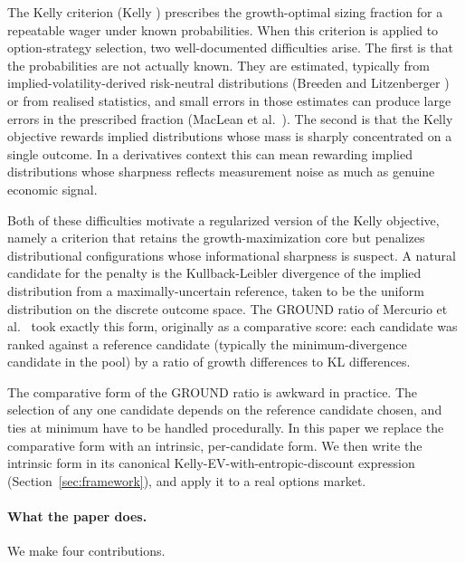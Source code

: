 \documentclass[11pt]{article}
\theoremstyle{definition}
\theoremstyle{remark}
\begin{document}
The Kelly criterion (Kelly \cite{kelly1956}) prescribes the
growth-optimal sizing fraction for a repeatable wager under known
probabilities. When this criterion is applied to option-strategy
selection, two well-documented difficulties arise. The first is that
the probabilities are not actually known. They are estimated,
typically from implied-volatility-derived risk-neutral distributions
(Breeden and Litzenberger \cite{breeden1978}) or from realised
statistics, and small errors in those estimates can produce large
errors in the prescribed fraction (MacLean et al.\ \cite{maclean2011}). The second is that the Kelly objective rewards
implied distributions whose mass is sharply concentrated on a single
outcome. In a derivatives context this can mean rewarding implied
distributions whose sharpness reflects measurement noise as much as
genuine economic signal.

Both of these difficulties motivate a regularized version of the
Kelly objective, namely a criterion that retains the
growth-maximization core but penalizes distributional configurations
whose informational sharpness is suspect. A natural candidate for
the penalty is the Kullback-Leibler divergence of the implied
distribution from a maximally-uncertain reference, taken to be the
uniform distribution on the discrete outcome space. The GROUND
ratio of Mercurio et al.\ \cite{mercurio2020binary} took exactly this form, originally as
a comparative score: each candidate was ranked against a
reference candidate (typically the minimum-divergence candidate in
the pool) by a ratio of growth differences to KL differences.

The comparative form of the GROUND ratio is awkward in practice. The
selection of any one candidate depends on the reference candidate chosen, and ties at minimum have to
be handled procedurally. In this paper we replace the comparative
form with an intrinsic, per-candidate form. We then write the
intrinsic form in its canonical Kelly-EV-with-entropic-discount
expression (Section~\ref{sec:framework}), and apply it to a real
options market.

\paragraph{What the paper does.}
We make four contributions.
\end{document}
